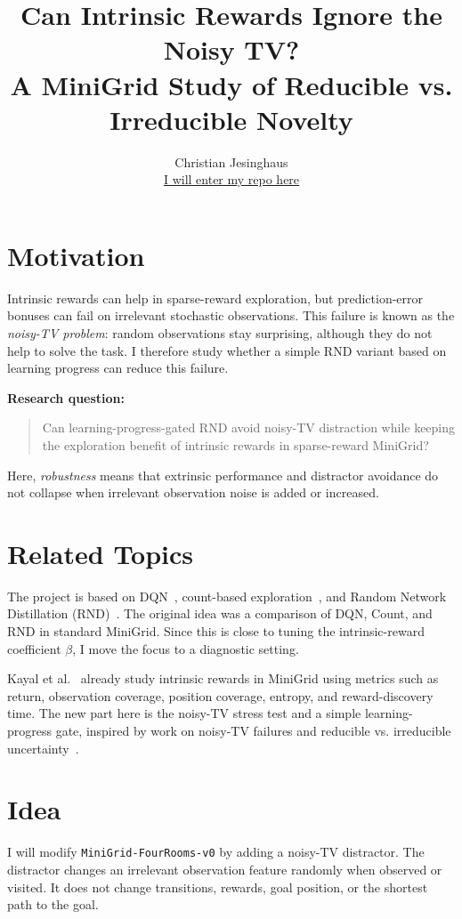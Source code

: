 \documentclass{article}
\title{Can Intrinsic Rewards Ignore the Noisy TV?\\
A MiniGrid Study of Reducible vs. Irreducible Novelty}
\author{Christian Jesinghaus \\
\url{I will enter my repo here}}
\begin{document}
\maketitle

\section{Motivation}
Intrinsic rewards can help in sparse-reward exploration, but prediction-error bonuses can fail on irrelevant stochastic observations. This failure is known as the \emph{noisy-TV problem}: random observations stay surprising, although they do not help to solve the task. I therefore study whether a simple RND variant based on learning progress can reduce this failure.

\textbf{Research question:}
\begin{quote}
Can learning-progress-gated RND avoid noisy-TV distraction while keeping the exploration benefit of intrinsic rewards in sparse-reward MiniGrid?
\end{quote}

Here, \emph{robustness} means that extrinsic performance and distractor avoidance do not collapse when irrelevant observation noise is added or increased.

\section{Related Topics}
The project is based on DQN~\citep{mnih-nature15}, count-based exploration~\citep{bellemare-nips16}, and Random Network Distillation (RND)~\citep{burda-iclr19}. The original idea was a comparison of DQN, Count, and RND in standard MiniGrid. Since this is close to tuning the intrinsic-reward coefficient $\beta$, I move the focus to a diagnostic setting.

Kayal et al.~\citep{kayal2025impact} already study intrinsic rewards in MiniGrid using metrics such as return, observation coverage, position coverage, entropy, and reward-discovery time. The new part here is the noisy-TV stress test and a simple learning-progress gate, inspired by work on noisy-TV failures and reducible vs. irreducible uncertainty~\citep{mavorparker2022noisytv,hou2025beyond}.

\section{Idea}
I will modify \texttt{MiniGrid-FourRooms-v0} by adding a noisy-TV distractor. The distractor changes an irrelevant observation feature randomly when observed or visited. It does not change transitions, rewards, goal position, or the shortest path to the goal.
\end{document}

